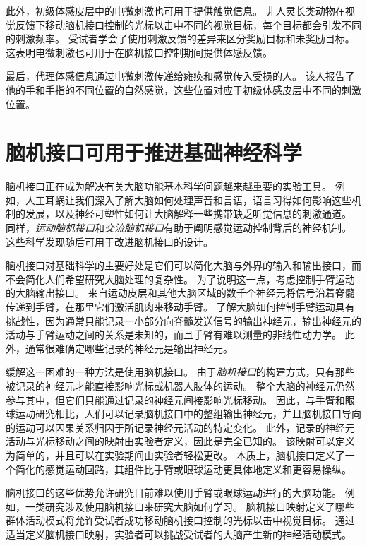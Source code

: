 此外，初级体感皮层中的电微刺激也可用于提供触觉信息。
非人灵长类动物在视觉反馈下移动脑机接口控制的光标以击中不同的视觉目标，每个目标都会引发不同的刺激频率。 
受试者学会了使用刺激反馈的差异来区分奖励目标和未奖励目标。
这表明电微刺激也可用于在脑机接口控制期间提供体感反馈。


最后，代理体感信息通过电微刺激传递给瘫痪和感觉传入受损的人。
该人报告了他的手和手指的不同位置的自然感觉，这些位置对应于初级体感皮层中不同的刺激位置。



\section{脑机接口可用于推进基础神经科学}

脑机接口正在成为解决有关大脑功能基本科学问题越来越重要的实验工具。
例如，人工耳蜗让我们深入了解大脑如何处理声音和言语，语言习得如何影响这些机制的发展，以及神经可塑性如何让大脑解释一些携带缺乏听觉信息的刺激通道。
同样，\textit{运动脑机接口}和\textit{交流脑机接口}有助于阐明感觉运动控制背后的神经机制。
这些科学发现随后可用于改进脑机接口的设计。


脑机接口对基础科学的主要好处是它们可以简化大脑与外界的输入和输出接口，而不会简化人们希望研究大脑处理的复杂性。
为了说明这一点，考虑控制手臂运动的大脑输出接口。
来自运动皮层和其他大脑区域的数千个神经元将信号沿着脊髓传递到手臂，在那里它们激活肌肉来移动手臂。
了解大脑如何控制手臂运动具有挑战性，因为通常只能记录一小部分向脊髓发送信号的输出神经元，输出神经元的活动与手臂运动之间的关系是未知的，而且手臂有难以测量的非线性动力学。
此外，通常很难确定哪些记录的神经元是输出神经元。


缓解这一困难的一种方法是使用脑机接口。
由于\textit{脑机接口}的构建方式，只有那些被记录的神经元才能直接影响光标或机器人肢体的运动。
整个大脑的神经元仍然参与其中，但它们只能通过记录的神经元间接影响光标移动。
因此，与手臂和眼球运动研究相比，人们可以记录脑机接口中的整组输出神经元，并且脑机接口导向的运动可以因果关系归因于所记录神经元活动的特定变化。
此外，记录的神经元活动与光标移动之间的映射由实验者定义，因此是完全已知的。
该映射可以定义为简单的，并且可以在实验期间由实验者轻松更改。
本质上，脑机接口定义了一个简化的感觉运动回路，其组件比手臂或眼球运动更具体地定义和更容易操纵。


脑机接口的这些优势允许研究目前难以使用手臂或眼球运动进行的大脑功能。
例如，一类研究涉及使用脑机接口来研究大脑如何学习。 
脑机接口映射定义了哪些群体活动模式将允许受试者成功移动脑机接口控制的光标以击中视觉目标。
通过适当定义脑机接口映射，实验者可以挑战受试者的大脑产生新的神经活动模式。


